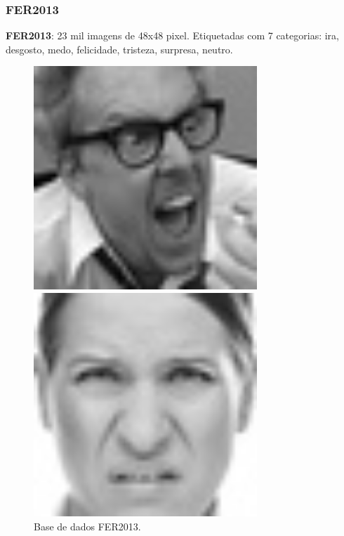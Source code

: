 \begin{frame}
\frametitle{\textbf{FER2013}}
\textbf{FER2013}: 23 mil imagens de 48x48 pixel.
Etiquetadas com 7 categorias:
ira, desgosto, medo, felicidade, tristeza, surpresa, neutro.
\begin{figure}[!ht]
    \centering
    \caption{Base de dados FER2013.}
    \begin{minipage}[t]{0.20\textwidth}
    \centering
      \includegraphics[width=0.75\textwidth]{images/fer2013/angry.jpg}
    \end{minipage}
    \hfill
    \begin{minipage}[t]{0.20\textwidth}
    \centering
      \includegraphics[width=0.75\textwidth]{images/fer2013/disgust.jpg}

\end{minipage}
\end{figure}
\end{frame}
